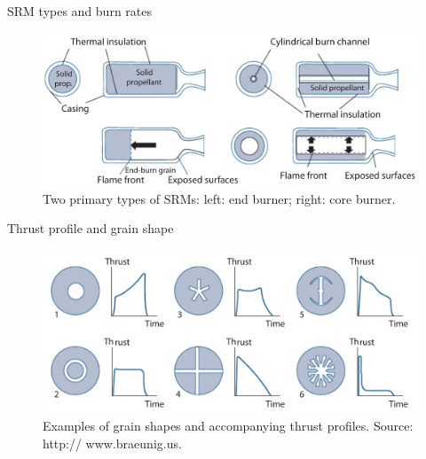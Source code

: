 \documentclass[
  ignorenonframetext,
]{beamer}
\begin{document}
\begin{frame}
\begin{block}{SRM types and burn rates}
\protect\hypertarget{srm-types-and-burn-rates}{}
\begin{figure}

{\centering \includegraphics{figs/fig4.10.png}

}

\caption{Two primary types of SRMs: left: end burner; right: core
burner.}

\end{figure}
\end{block}
\end{frame}

\begin{frame}
\begin{block}{Thrust profile and grain shape}
\protect\hypertarget{thrust-profile-and-grain-shape}{}
\begin{figure}

{\centering \includegraphics{figs/fig4.12.png}

}

\caption{Examples of grain shapes and accompanying thrust profiles.
Source: http:// www.braeunig.us.}

\end{figure}
\end{block}
\end{frame}
\end{document}
